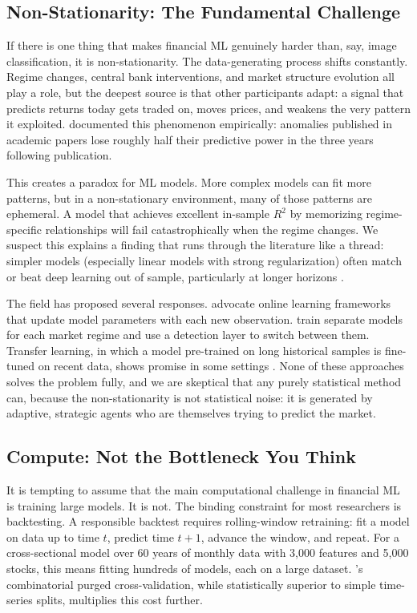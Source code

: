 \subsection{Non-Stationarity: The Fundamental Challenge}

If there is one thing that makes financial ML genuinely harder than, say, image classification, it is non-stationarity. The data-generating process shifts constantly. Regime changes, central bank interventions, and market structure evolution all play a role, but the deepest source is that other participants adapt: a signal that predicts returns today gets traded on, moves prices, and weakens the very pattern it exploited. \citet{McLean2016} documented this phenomenon empirically: anomalies published in academic papers lose roughly half their predictive power in the three years following publication.

This creates a paradox for ML models. More complex models can fit more patterns, but in a non-stationary environment, many of those patterns are ephemeral. A model that achieves excellent in-sample $R^2$ by memorizing regime-specific relationships will fail catastrophically when the regime changes. We suspect this explains a finding that runs through the literature like a thread: simpler models (especially linear models with strong regularization) often match or beat deep learning out of sample, particularly at longer horizons \citep{Avramov2023}.

The field has proposed several responses. \citet{Huck2019} advocate online learning frameworks that update model parameters with each new observation. \citet{Nystrup2020} train separate models for each market regime and use a detection layer to switch between them. Transfer learning, in which a model pre-trained on long historical samples is fine-tuned on recent data, shows promise in some settings \citep{Li2022}. None of these approaches solves the problem fully, and we are skeptical that any purely statistical method can, because the non-stationarity is not statistical noise: it is generated by adaptive, strategic agents who are themselves trying to predict the market.

\subsection{Compute: Not the Bottleneck You Think}

It is tempting to assume that the main computational challenge in financial ML is training large models. It is not. The binding constraint for most researchers is backtesting. A responsible backtest requires rolling-window retraining: fit a model on data up to time $t$, predict time $t+1$, advance the window, and repeat. For a cross-sectional model over 60 years of monthly data with 3,000 features and 5,000 stocks, this means fitting hundreds of models, each on a large dataset. \citet{DePrado2018}'s combinatorial purged cross-validation, while statistically superior to simple time-series splits, multiplies this cost further.

